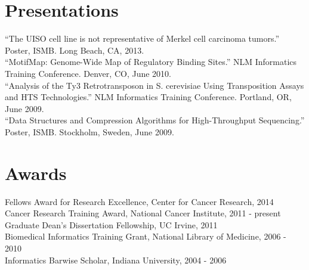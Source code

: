 \documentclass[margin,line]{res}
\begin{document}
\begin{resume}
\section{Presentations}
``The UISO cell line is not representative of Merkel cell carcinoma tumors.'' Poster, ISMB. Long Beach, CA, 2013.\\
``MotifMap: Genome-Wide Map of Regulatory Binding Sites.'' NLM Informatics Training Conference. Denver, CO, June 2010.\\
``Analysis of the Ty3 Retrotransposon in S. cerevisiae Using Transposition Assays and HTS Technologies.'' NLM Informatics Training Conference. Portland, OR, June 2009.\\
``Data Structures and Compression Algorithms for High-Throughput Sequencing.'' Poster, ISMB. Stockholm, Sweden, June 2009.

\section{Awards}
Fellows Award for Research Excellence, Center for Cancer Research, 2014\\
Cancer Research Training Award, National Cancer Institute, 2011 - present\\
Graduate Dean’s Dissertation Fellowship, UC Irvine, 2011\\
Biomedical Informatics Training Grant, National Library of Medicine, 2006 - 2010\\
Informatics Barwise Scholar, Indiana University, 2004 - 2006

\end{resume}
\end{document}
